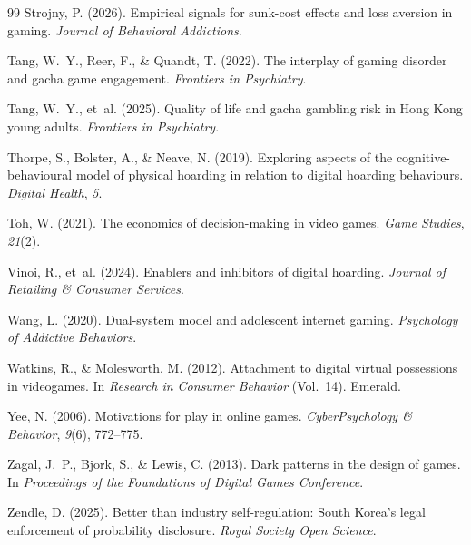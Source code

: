 \documentclass[12pt]{article}
\begin{document}
\begin{thebibliography}{99}
Strojny, P. (2026).
\newblock Empirical signals for sunk-cost effects and loss aversion in gaming.
\newblock \textit{Journal of Behavioral Addictions}.

Tang, W.~Y., Reer, F., \& Quandt, T. (2022).
\newblock The interplay of gaming disorder and gacha game engagement.
\newblock \textit{Frontiers in Psychiatry}.

Tang, W.~Y., et~al. (2025).
\newblock Quality of life and gacha gambling risk in Hong Kong young adults.
\newblock \textit{Frontiers in Psychiatry}.

Thorpe, S., Bolster, A., \& Neave, N. (2019).
\newblock Exploring aspects of the cognitive-behavioural model of physical hoarding in relation to digital hoarding behaviours.
\newblock \textit{Digital Health}, \textit{5}.

Toh, W. (2021).
\newblock The economics of decision-making in video games.
\newblock \textit{Game Studies}, \textit{21}(2).

Vinoi, R., et~al. (2024).
\newblock Enablers and inhibitors of digital hoarding.
\newblock \textit{Journal of Retailing \& Consumer Services}.

Wang, L. (2020).
\newblock Dual-system model and adolescent internet gaming.
\newblock \textit{Psychology of Addictive Behaviors}.

Watkins, R., \& Molesworth, M. (2012).
\newblock Attachment to digital virtual possessions in videogames.
\newblock In \textit{Research in Consumer Behavior} (Vol.~14). Emerald.

Yee, N. (2006).
\newblock Motivations for play in online games.
\newblock \textit{CyberPsychology \& Behavior}, \textit{9}(6), 772--775.

Zagal, J.~P., Bjork, S., \& Lewis, C. (2013).
\newblock Dark patterns in the design of games.
\newblock In \textit{Proceedings of the Foundations of Digital Games Conference}.

Zendle, D. (2025).
\newblock Better than industry self-regulation: South Korea's legal enforcement of probability disclosure.
\newblock \textit{Royal Society Open Science}.


\end{thebibliography}
\end{document}
